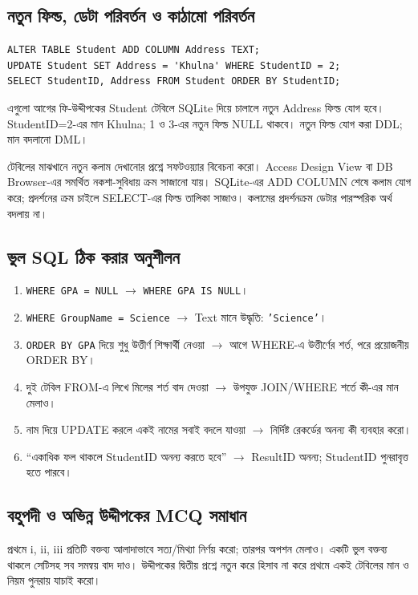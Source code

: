 \subsection{নতুন ফিল্ড, ডেটা পরিবর্তন ও কাঠামো পরিবর্তন}
\begin{verbatim}
ALTER TABLE Student ADD COLUMN Address TEXT;
UPDATE Student SET Address = 'Khulna' WHERE StudentID = 2;
SELECT StudentID, Address FROM Student ORDER BY StudentID;
\end{verbatim}
এগুলো আগের ফি-উদ্দীপকের Student টেবিলে SQLite দিয়ে চালালে নতুন Address ফিল্ড যোগ হবে। StudentID=2-এর মান Khulna; 1 ও 3-এর নতুন ফিল্ড NULL থাকবে। নতুন ফিল্ড যোগ করা DDL; মান বদলানো DML।

টেবিলের মাঝখানে নতুন কলাম দেখানোর প্রশ্নে সফটওয়্যার বিবেচনা করো। Access Design View বা DB Browser-এর সমর্থিত নকশা-সুবিধায় ক্রম সাজানো যায়। SQLite-এর ADD COLUMN শেষে কলাম যোগ করে; প্রদর্শনের ক্রম চাইলে SELECT-এর ফিল্ড তালিকা সাজাও। কলামের প্রদর্শনক্রম ডেটার পারস্পরিক অর্থ বদলায় না।

\subsection{ভুল SQL ঠিক করার অনুশীলন}
\begin{enumerate}
\item \texttt{WHERE GPA = NULL} $\rightarrow$ \texttt{WHERE GPA IS NULL}।
\item \texttt{WHERE GroupName = Science} $\rightarrow$ Text মানে উদ্ধৃতি: \texttt{'Science'}।
\item \texttt{ORDER BY GPA} দিয়ে শুধু উত্তীর্ণ শিক্ষার্থী নেওয়া $\rightarrow$ আগে WHERE-এ উত্তীর্ণের শর্ত, পরে প্রয়োজনীয় ORDER BY।
\item দুই টেবিল FROM-এ লিখে মিলের শর্ত বাদ দেওয়া $\rightarrow$ উপযুক্ত JOIN/WHERE শর্তে কী-এর মান মেলাও।
\item নাম দিয়ে UPDATE করলে একই নামের সবাই বদলে যাওয়া $\rightarrow$ নির্দিষ্ট রেকর্ডের অনন্য কী ব্যবহার করো।
\item “একাধিক ফল থাকলে StudentID অনন্য করতে হবে” $\rightarrow$ ResultID অনন্য; StudentID পুনরাবৃত্ত হতে পারবে।
\end{enumerate}

\subsection{বহুপদী ও অভিন্ন উদ্দীপকের MCQ সমাধান}
প্রথমে i, ii, iii প্রতিটি বক্তব্য আলাদাভাবে সত্য/মিথ্যা নির্ণয় করো; তারপর অপশন মেলাও। একটি ভুল বক্তব্য থাকলে সেটিসহ সব সমন্বয় বাদ দাও। উদ্দীপকের দ্বিতীয় প্রশ্নে নতুন করে হিসাব না করে প্রথমে একই টেবিলের মান ও নিয়ম পুনরায় যাচাই করো।

